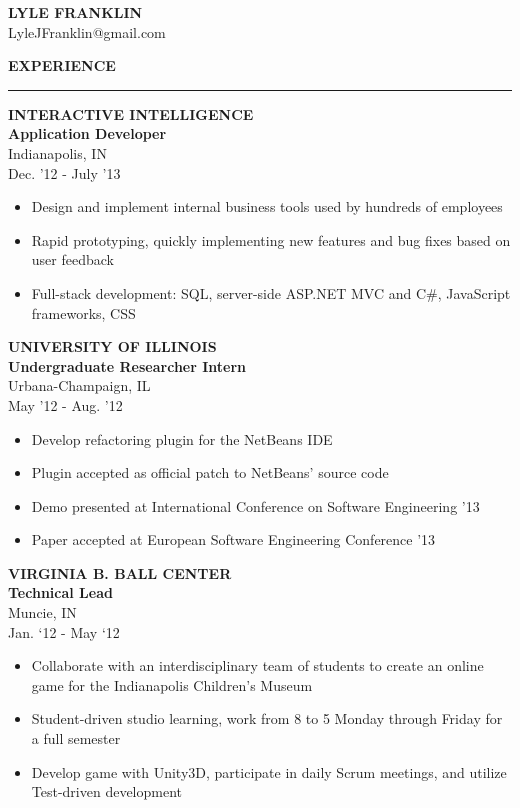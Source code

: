 \documentclass[a4paper,10pt]{article}
\newcommand{\name}[1]{\textbf{\huge{#1}}}
\newcommand{\header}[1]
{
{\Large \textbf {\uppercase{#1}}}
\vspace{0.05in}
\hrule
\vspace{0.15in}
}
\newenvironment{details}
{\begin{itemize}[label=\scalebox{.5}{\ding{117}},leftmargin=0.15in]}
{\end{itemize}}
\begin{document}
\name{LYLE FRANKLIN}\\
\indent
LyleJFranklin@gmail.com

\vspace{0.2in}

\begin{minipage}[t]{0.5\textwidth}
\header{Experience}

\textbf{INTERACTIVE INTELLIGENCE\\Application Developer}\\
Indianapolis, IN\\
Dec. '12 - July '13

\begin{details}
  \item Design and implement internal business tools used by hundreds of employees
  \item Rapid prototyping, quickly implementing new features and bug fixes based on user feedback
  \item Full-stack development: SQL, server-side ASP.NET MVC and C\#, JavaScript frameworks, CSS
\end{details}


\textbf{UNIVERSITY OF ILLINOIS\\Undergraduate Researcher Intern}\\
Urbana-Champaign, IL\\
May '12 - Aug. '12

\begin{details}
  \item Develop refactoring plugin for the NetBeans IDE
  \item Plugin accepted as official patch to NetBeans’ source code
  \item Demo presented at International Conference on Software Engineering '13
  \item Paper accepted at European Software Engineering Conference '13
\end{details}

\textbf{VIRGINIA B. BALL CENTER\\Technical Lead}\\
Muncie, IN\\
Jan. ‘12 - May ‘12

\begin{details}
  \item Collaborate with an interdisciplinary team of students to create
an online game for the Indianapolis Children’s Museum
  \item Student-driven studio learning, work from 8 to 5 Monday
through Friday for a full semester
  \item Develop game with Unity3D, participate in daily Scrum meetings, and utilize Test-driven
development
\end{details}


\end{minipage}
\end{document}
